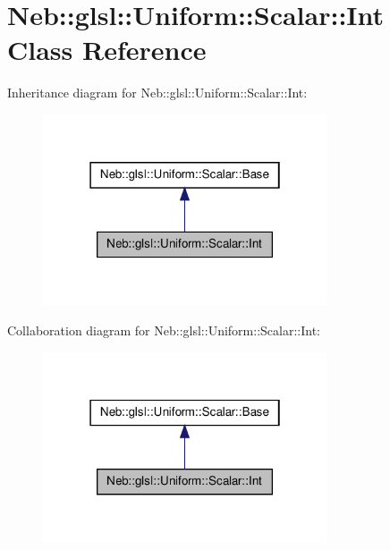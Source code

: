 \hypertarget{classNeb_1_1glsl_1_1Uniform_1_1Scalar_1_1Int}{\section{\-Neb\-:\-:glsl\-:\-:\-Uniform\-:\-:\-Scalar\-:\-:\-Int \-Class \-Reference}
\label{classNeb_1_1glsl_1_1Uniform_1_1Scalar_1_1Int}
}


\-Inheritance diagram for \-Neb\-:\-:glsl\-:\-:\-Uniform\-:\-:\-Scalar\-:\-:\-Int\-:\nopagebreak
\begin{figure}[H]
\begin{center}
\leavevmode
\includegraphics[width=238pt]{classNeb_1_1glsl_1_1Uniform_1_1Scalar_1_1Int__inherit__graph}
\end{center}
\end{figure}


\-Collaboration diagram for \-Neb\-:\-:glsl\-:\-:\-Uniform\-:\-:\-Scalar\-:\-:\-Int\-:\nopagebreak
\begin{figure}[H]
\begin{center}
\leavevmode
\includegraphics[width=238pt]{classNeb_1_1glsl_1_1Uniform_1_1Scalar_1_1Int__coll__graph}
\end{center}
\end{figure}
